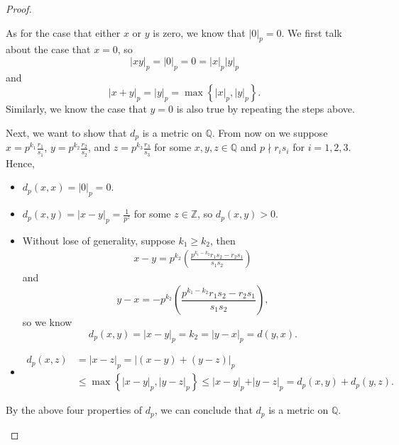 \begin{proof}
\begin{itemize}
    As for the case that either \(x\) or \(y\) is zero, we know that \(\vert 0 \vert_p = 0 \). We first talk about the case that \(x=0\), so 
    \[
      \vert xy \vert_p = \vert 0 \vert_p = 0 = \vert x \vert_p \vert y \vert_p
    \]  and 
    \[
      \vert x+y \vert_p =  \vert y \vert_p = \max \left\{ \vert x \vert_ p, \vert y \vert_p   \right\}  .
    \] 
    Similarly, we know the case that \(y=0\) is also true by repeating the steps above. 
    
    Next, we want to show that \(d_p\) is a metric on \(\mathbb{Q} \). From now on we suppose \(x = p^{k_1} \frac{r_1}{s_1}\), \(y = p^{k_2} \frac{r_2}{s_2}\), and \(z = p^{k_3} \frac{r_3}{s_3}\) for some \(x,y,z \in \mathbb{Q} \) and \(p \nmid r_i s_i\) for \(i=1,2,3\). Hence,       
    \begin{itemize}
      \item \(d_p(x, x) = \vert 0 \vert_p = 0 \). 
      \item \(d_p(x,y) = \vert x-y \vert_p = \frac{1}{p^z}\) for some \(z \in \mathbb{Z} \), so \(d_p(x,y) > 0\). 
      \item Without lose of generality, suppose \(k_1 \ge k_2\), then\begin{align*}
        x - y = p^{k_2} \left( \frac{p^{k_1 - k_2}r_1 s_2 - r_2 s_1}{s_1 s_2} \right) 
      \end{align*}
      and 
      \[
        y - x = -p^{k_2} \left( \frac{p^{k_1 - k_2}r_1 s_2 - r_2 s_1}{s_1 s_2} \right), 
      \]
      so we know 
      \[
        d_p(x,y) = \vert x - y \vert_p = k_2 = \vert y - x \vert_p = d(y,x).  
      \]
      \item
      \begin{align*}
        d_p(x,z) &= \vert x-z \vert_p =  \left\vert (x-y) + (y-z) \right\vert _p \\ 
        &\le \max \left\{ \vert x-y \vert_p, \vert y-z \vert_p   \right\} \le \vert x-y \vert_p + \vert y-z \vert_p = d_p(x,y) + d_p(y,z).
      \end{align*}
    \end{itemize} 
    By the above four properties of \(d_p\), we can conclude that \(d_p\) is a metric on \(\mathbb{Q} \).    
  \end{itemize}
\end{proof}


